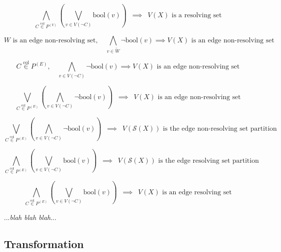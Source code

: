 \documentclass{article}
\begin{document}
	\[ \bigwedge \limits_{\displaystyle C \overset{\mathrm{col}}{\in} P^{(V)}} \left( \bigvee \limits_{\displaystyle v \in V(\neg C)} \mathrm{bool}(v) \right)\enspace \implies\enspace V(X) \text{ is a resolving set} \]

	\[ W \text{ is an edge non-resolving set},\quad \bigwedge \limits_{\displaystyle v \in \widetilde{W}} \neg \mathrm{bool}(v) \implies V(X) \text{ is an edge non-resolving set} \]

	\[ C \overset{\mathrm{col}}{\in} P^{(E)},\quad \bigwedge \limits_{\displaystyle v \in V(\neg C)} \neg \mathrm{bool}(v) \implies V(X) \text{ is an edge non-resolving set} \]

	\[ \bigvee \limits_{\displaystyle C \overset{\mathrm{col}}{\in} P^{(E)}} \left( \bigwedge \limits_{\displaystyle v \in V(\neg C)} \neg \mathrm{bool}(v) \right)\enspace \implies\enspace V(X) \text{ is an edge non-resolving set} \]

	\[ \bigvee \limits_{\displaystyle C \overset{\mathrm{col}}{\in} P^{(E)}} \left( \bigwedge \limits_{\displaystyle v \in V(\neg C)} \neg \mathrm{bool}(v) \right)\enspace \implies\enspace V(\mathcal{S}(X)) \text{ is the edge non-resolving set partition} \]

	\[ \bigwedge \limits_{\displaystyle C \overset{\mathrm{col}}{\in} P^{(E)}} \left( \bigvee \limits_{\displaystyle v \in V(\neg C)} \mathrm{bool}(v) \right)\enspace \implies\enspace V(\mathcal{S}(X)) \text{ is the edge resolving set partition} \]

	\[ \bigwedge \limits_{\displaystyle C \overset{\mathrm{col}}{\in} P^{(E)}} \left( \bigvee \limits_{\displaystyle v \in V(\neg C)} \mathrm{bool}(v) \right)\enspace \implies\enspace V(X) \text{ is an edge resolving set} \]

	...\textit{blah blah blah}...

	\clearpage
	\subsection{Transformation}
\end{document}

